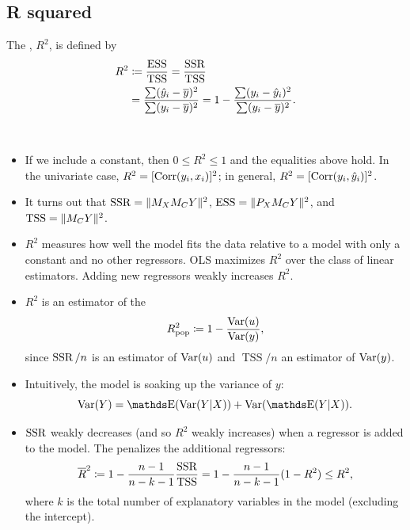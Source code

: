\documentclass[letterpaper, 10pt]{article}
\DeclareMathOperator{\TSS}{TSS}
\DeclareMathOperator{\ESS}{ESS}
\begin{document}
\subsection{R squared}
\begin{definition}
  The , \(R^2\), is defined by
  \begin{align*}
    R^2
    &\coloneqq \frac{\ESS}{\TSS}
    = \frac{\SSR}{\TSS} \\
    &= \frac{\sum (\hat{y}_i - \overline{y})^2}{\sum (y_i - \overline{y})^2}
    = 1 - \frac{\sum (y_i - \hat{y}_i)^2}{\sum (y_i - \overline{y})^2}.
  \end{align*}
\end{definition}
\begin{remark}~
  \begin{itemize}
    \item If we include a constant, then \(0 \leq R^2 \leq 1\) and the equalities above hold.
      In the univariate case, \(R^2 = [\operatorname{Corr}(y_i, x_i)]^2\); in general, \(R^2 = [\operatorname{Corr}(y_i, \hat{y}_i)]^2\).
    \item It turns out that \(\operatorname{SSR} = \lVert M_X M_C Y\rVert^2\), \(\ESS = \norm{P_X M_C Y}^2\), and  \(\TSS = \norm{M_C Y}^2\).
    \item \(R^2\) measures how well the model fits the data relative to a model with only a constant and no other regressors.
      OLS maximizes \(R^2\) over the class of linear estimators.
      Adding new regressors weakly increases \(R^2\).
    \item \(R^2\) is an estimator of the 
      \[
        R^2_{\text{pop}} \coloneqq 1 - \frac{\operatorname{Var}(u)}{\operatorname{Var}(y)},
      \]
      since \(\operatorname{SSR} / n\) is an estimator of \(\operatorname{Var}(u)\) and \(\TSS / n\) an estimator of \(\operatorname{Var}(y)\).
    \item Intuitively, the model is soaking up the variance of \(y\):
      \[
        \Var(Y)
        = \E(\Var(Y|X)) + \Var(\E(Y|X)).
      \]
    \item \(\operatorname{SSR}\) weakly decreases (and so \(R^2\) weakly increases) when a regressor is added to the model.
      The  penalizes the additional regressors:
      \[
        \overline{R}^2
        \coloneqq 1 - \frac{n - 1}{n - k - 1} \frac{\SSR}{\TSS}
        = 1 - \frac{n - 1}{n - k - 1} (1 - R^2)
        \leq R^2,
      \]
      where \(k\) is the total number of explanatory variables in the model (excluding the intercept).
  \end{itemize}
\end{remark}
\end{document}
